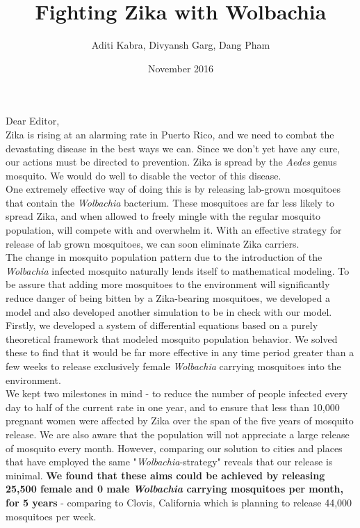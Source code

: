 \documentclass{article}
\title{Fighting Zika with Wolbachia}
\author{Aditi Kabra, Divyansh Garg, Dang Pham}
\date{November 2016}
\begin{document}
Dear Editor,\\

Zika is rising at an alarming rate in Puerto Rico, and we need to combat the devastating disease in the best ways we can. Since we don’t yet have any cure, our actions must be directed to prevention. Zika is spread by the \textit{Aedes} genus mosquito. We would do well to disable the vector of this disease.\\

One extremely effective way of doing this is by releasing lab-grown mosquitoes that contain the \textit{Wolbachia} bacterium. These mosquitoes are far less likely to spread Zika, and when allowed to freely mingle with the regular mosquito population, will compete with and overwhelm it. With an effective strategy for release of lab grown mosquitoes, we can soon eliminate Zika carriers.\\

The change in mosquito population pattern due to the introduction of the \textit{Wolbachia} infected mosquito naturally lends itself to mathematical modeling. To be assure that adding more mosquitoes to the environment will significantly reduce danger of being bitten by a Zika-bearing mosquitoes, we developed a model and also developed another simulation to be in check with our model.\\

Firstly, we developed a system of differential equations based on a purely theoretical framework that modeled mosquito population behavior. We solved these to find that it would be far more effective in any time period greater than a few weeks to release exclusively female \textit{Wolbachia} carrying mosquitoes into the environment.\\

We kept two milestones in mind - to reduce the number of people infected every day to half of the current rate in one year, and to ensure that less than 10,000 pregnant women were affected by Zika over the span of the five years of mosquito release. We are also aware that the population will not appreciate a large release of mosquito every month. However, comparing our solution to cities and places that have employed the same "\textit{Wolbachia}-strategy" reveals that our release is minimal. \textbf{We found that these aims could be achieved by releasing 25,500 female and 0 male \textit{Wolbachia} carrying mosquitoes per month, for 5 years} - comparing to Clovis, California which is planning to release 44,000 mosquitoes per week.\\
\end{document}
